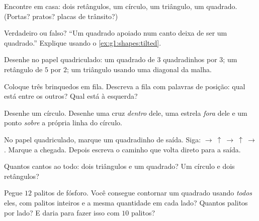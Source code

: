 \begin{exercise}[$\star$]\label{exo:g1:shapes:2}
Encontre em casa: dois retângulos, um círculo, um triângulo, um
quadrado. (Portas? pratos? placas de trânsito?)
\end{exercise}

\begin{exercise}[$\star$]\label{exo:g1:shapes:3}
Verdadeiro ou falso? ``Um quadrado apoiado num canto deixa de ser um
quadrado.'' Explique usando o \cref{ex:g1:shapes:tilted}.
\end{exercise}

\begin{exercise}[$\star$]\label{exo:g1:shapes:4}
Desenhe no papel quadriculado: um quadrado de $3$ quadradinhos por
$3$; um retângulo de $5$ por $2$; um triângulo usando uma diagonal
da malha.
\end{exercise}

\begin{exercise}[$\star$]\label{exo:g1:shapes:5}
Coloque três brinquedos em fila. Descreva a fila com palavras de
posição: qual está entre os outros? Qual está à esquerda?
\end{exercise}

\begin{exercise}[$\star$]\label{exo:g1:shapes:6}
Desenhe um círculo. Desenhe uma cruz \emph{dentro} dele, uma estrela
\emph{fora} dele e um ponto \emph{sobre} a própria linha do círculo.
\end{exercise}

\begin{exercise}[$\star$]\label{exo:g1:shapes:7}
No papel quadriculado, marque um quadradinho de saída. Siga:
$\to\ \uparrow\ \to\ \uparrow\ \to$. Marque a chegada. Depois
escreva o caminho que volta direto para a saída.
\end{exercise}

\begin{exercise}[$\star$]\label{exo:g1:shapes:8}
Quantos cantos ao todo: dois triângulos e um quadrado? Um círculo e
dois retângulos?
\end{exercise}

\begin{exercise}[$\star\star$]\label{exo:g1:shapes:9}
Pegue $12$ palitos de fósforo. Você consegue contornar um quadrado
usando \emph{todos} eles, com palitos inteiros e a mesma quantidade
em cada lado? Quantos palitos por lado? E daria para fazer isso com
$10$ palitos?
\end{exercise}
